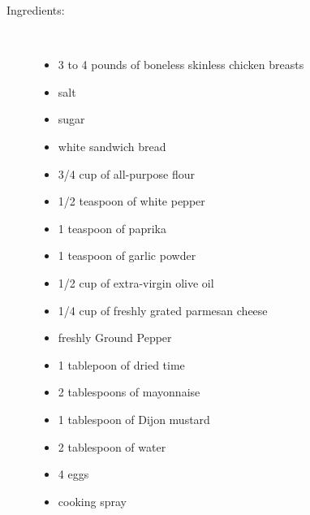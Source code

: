 \documentclass[11pt,letterpaper]{article}
\begin{document}
\begin{description}

\item[Ingredients:]\ \\
	\begin{itemize}
	\item 3 to 4 pounds of boneless skinless chicken breasts
	\item salt
	\item sugar
	\item white sandwich bread
	\item 3/4 cup of all-purpose flour
	\item 1/2 teaspoon of white pepper
	\item 1 teaspoon of paprika
	\item 1 teaspoon of garlic powder
	\item 1/2 cup of extra-virgin olive oil
	\item 1/4 cup of freshly grated parmesan cheese
	\item freshly Ground Pepper
	\item 1 tablepoon of dried time
	\item 2 tablespoons of mayonnaise
	\item 1 tablespoon of Dijon mustard
	\item 2 tablespoon of water
	\item 4 eggs 
	\item cooking spray
	\end{itemize}


\end{description}
\end{document}
